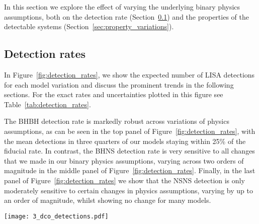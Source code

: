 In this section we explore the effect of varying the underlying binary physics assumptions, both on the detection rate (Section~\ref{sec:detection_rate_analysis}) and the properties of the detectable systems (Section~\ref{sec:property_variations}).

\subsection{Detection rates}\label{sec:detection_rate_analysis}
In Figure~\ref{fig:detection_rates}, we show the expected number of LISA detections for each model variation and discuss the prominent trends in the following sections. For the exact rates and uncertainties plotted in this figure see Table~\ref{tab:detection_rates}.

The BHBH detection rate is markedly robust across variations of physics assumptions, as can be seen in the top panel of Figure~\ref{fig:detection_rates}, with the mean detections in three quarters of our models staying within 25\% of the fiducial rate. In contrast, the BHNS detection rate is very sensitive to all changes that we made in our binary physics assumptions, varying across two orders of magnitude in the middle panel of Figure~\ref{fig:detection_rates}. Finally, in the last panel of Figure~\ref{fig:detection_rates} we show that the NSNS detection is only moderately sensitive to certain changes in physics assumptions, varying by up to an order of magnitude, whilst showing no change for many models.

\begin{figure*}[p]
    \centering
    \texttt{[image: 3\_dco\_detections.pdf]}
    \caption{The number of expected detections in the LISA mission for different DCO types and model variations. Error bars show the 1- (solid) and 2-$\sigma$ (dotted) Poisson uncertainties. An arrow indicates that the error bar extends to zero. The left axis and grid lines show the number of detections in a 4-year LISA mission and the right axis shows an approximation of the number of detections in a 10-year mission (we scale the axis by $\sqrt{T_{\rm obs}}$, see Table~\ref{tab:detection_rates} for exact rates). Each model is described in further detail in Table~\ref{tab:physics_variations} and details of the fiducial assumptions are in Section~\ref{app:fiducial_physics}. See Sec.~\ref{sec:detection_rate_analysis} for a discussion. }
    \label{fig:detection_rates}
\end{figure*}

